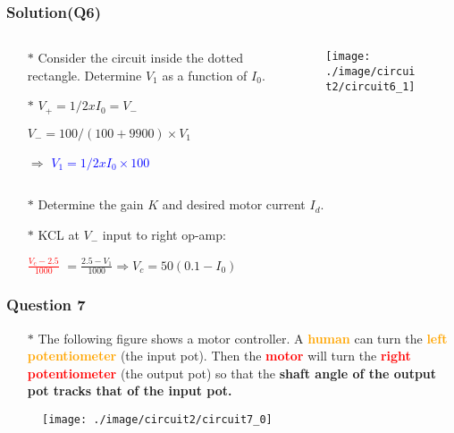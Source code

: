 \documentclass{beamer}
\newcommand{\blue}[1]{\textcolor{blue}{#1}}
\newcommand{\red}[1]{\textcolor{red}{#1}}
\newcommand{\orange}[1]{\textcolor{orange}{#1}}
\begin{document}
\begin{frame}
\frametitle{Solution(Q6)}

\begin{columns}

\begin{column}{6cm}
\begin{itemize} \itemsep1pt \parskip0pt 
  \item[$\ast$] Consider the circuit inside the dotted rectangle. Determine $V_1$ as a function of $I_0$.
  \item[$\ast$] $V_+ = 1/2 x I_0 = V_-$
  \item[] $V_- = 100/(100+9900) \times V_1$
  \item[$\Rightarrow$] \blue{$V_1 = 1/2 x I_0 \times 100$}
\end{itemize}
\end{column}


\begin{column}{7.5cm}
\begin{figure}[H]
  \centering
  \texttt{[image: ./image/circuit2/circuit6\_1]}
\end{figure}
\end{column}

\end{columns}

\begin{itemize} \itemsep1pt \parskip0pt 
  \item[$\ast$] Determine the gain $K$ and desired motor current $I_d$.
  \item[$\ast$] KCL at $V_-$ input to right op-amp:
  \item[] \hspace{6 mm}\red{$\frac{V_c-2.5}{1000}$} $= \frac{2.5-V_1}{1000} \Rightarrow V_c = 50(0.1-I_0)$
\end{itemize}
\end{frame}


\begin{frame}
\frametitle{Question 7}
\begin{itemize} \itemsep1pt \parskip0pt 
  \item[$\ast$]The following figure shows a motor controller. A \orange{\bf human} can turn the \orange{\bf left potentiometer} (the input pot). Then the \red{\bf motor} will turn the \red{\bf right potentiometer} (the output pot) so that the {\bf shaft angle of the output pot tracks that of the input pot.}
\end{itemize}



\begin{figure}[H]
  \centering
  \texttt{[image: ./image/circuit2/circuit7\_0]}
\end{figure}



\end{frame}
\end{document}
